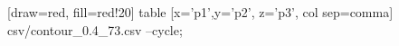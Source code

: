   [draw=red, fill=red!20] table [x='p1',y='p2', z='p3', col sep=comma] {csv/contour_0.4_73.csv} --cycle; 
